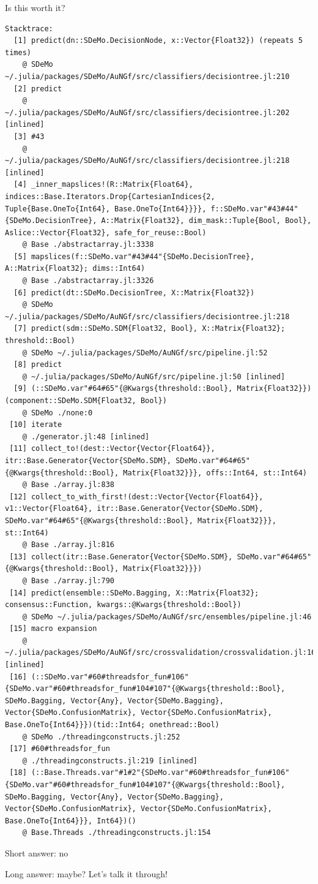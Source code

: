 \documentclass[12pt, smalloffset, compress, aspectratio=1610]{beamer}
\begin{document}
\begin{frame}[fragile]{Is this worth it?}
\begin{verbatim}
Stacktrace:
  [1] predict(dn::SDeMo.DecisionNode, x::Vector{Float32}) (repeats 5 times)
    @ SDeMo ~/.julia/packages/SDeMo/AuNGf/src/classifiers/decisiontree.jl:210
  [2] predict
    @ ~/.julia/packages/SDeMo/AuNGf/src/classifiers/decisiontree.jl:202 [inlined]
  [3] #43
    @ ~/.julia/packages/SDeMo/AuNGf/src/classifiers/decisiontree.jl:218 [inlined]
  [4] _inner_mapslices!(R::Matrix{Float64}, indices::Base.Iterators.Drop{CartesianIndices{2, Tuple{Base.OneTo{Int64}, Base.OneTo{Int64}}}}, f::SDeMo.var"#43#44"{SDeMo.DecisionTree}, A::Matrix{Float32}, dim_mask::Tuple{Bool, Bool}, Aslice::Vector{Float32}, safe_for_reuse::Bool)
    @ Base ./abstractarray.jl:3338
  [5] mapslices(f::SDeMo.var"#43#44"{SDeMo.DecisionTree}, A::Matrix{Float32}; dims::Int64)
    @ Base ./abstractarray.jl:3326
  [6] predict(dt::SDeMo.DecisionTree, X::Matrix{Float32})
    @ SDeMo ~/.julia/packages/SDeMo/AuNGf/src/classifiers/decisiontree.jl:218
  [7] predict(sdm::SDeMo.SDM{Float32, Bool}, X::Matrix{Float32}; threshold::Bool)
    @ SDeMo ~/.julia/packages/SDeMo/AuNGf/src/pipeline.jl:52
  [8] predict
    @ ~/.julia/packages/SDeMo/AuNGf/src/pipeline.jl:50 [inlined]
  [9] (::SDeMo.var"#64#65"{@Kwargs{threshold::Bool}, Matrix{Float32}})(component::SDeMo.SDM{Float32, Bool})
    @ SDeMo ./none:0
 [10] iterate
    @ ./generator.jl:48 [inlined]
 [11] collect_to!(dest::Vector{Vector{Float64}}, itr::Base.Generator{Vector{SDeMo.SDM}, SDeMo.var"#64#65"{@Kwargs{threshold::Bool}, Matrix{Float32}}}, offs::Int64, st::Int64)
    @ Base ./array.jl:838
 [12] collect_to_with_first!(dest::Vector{Vector{Float64}}, v1::Vector{Float64}, itr::Base.Generator{Vector{SDeMo.SDM}, SDeMo.var"#64#65"{@Kwargs{threshold::Bool}, Matrix{Float32}}}, st::Int64)
    @ Base ./array.jl:816
 [13] collect(itr::Base.Generator{Vector{SDeMo.SDM}, SDeMo.var"#64#65"{@Kwargs{threshold::Bool}, Matrix{Float32}}})
    @ Base ./array.jl:790
 [14] predict(ensemble::SDeMo.Bagging, X::Matrix{Float32}; consensus::Function, kwargs::@Kwargs{threshold::Bool})
    @ SDeMo ~/.julia/packages/SDeMo/AuNGf/src/ensembles/pipeline.jl:46
 [15] macro expansion
    @ ~/.julia/packages/SDeMo/AuNGf/src/crossvalidation/crossvalidation.jl:169 [inlined]
 [16] (::SDeMo.var"#60#threadsfor_fun#106"{SDeMo.var"#60#threadsfor_fun#104#107"{@Kwargs{threshold::Bool}, SDeMo.Bagging, Vector{Any}, Vector{SDeMo.Bagging}, Vector{SDeMo.ConfusionMatrix}, Vector{SDeMo.ConfusionMatrix}, Base.OneTo{Int64}}})(tid::Int64; onethread::Bool)
    @ SDeMo ./threadingconstructs.jl:252
 [17] #60#threadsfor_fun
    @ ./threadingconstructs.jl:219 [inlined]
 [18] (::Base.Threads.var"#1#2"{SDeMo.var"#60#threadsfor_fun#106"{SDeMo.var"#60#threadsfor_fun#104#107"{@Kwargs{threshold::Bool}, SDeMo.Bagging, Vector{Any}, Vector{SDeMo.Bagging}, Vector{SDeMo.ConfusionMatrix}, Vector{SDeMo.ConfusionMatrix}, Base.OneTo{Int64}}}, Int64})()
    @ Base.Threads ./threadingconstructs.jl:154
\end{verbatim}

Short answer: no

Long answer: maybe? Let's talk it through!
\end{frame}
\end{document}
